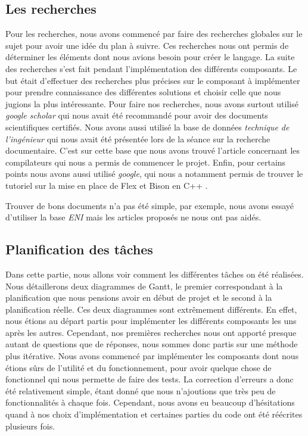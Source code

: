 \documentclass[a4paper]{article}%
\begin{document}
\subsection{Les recherches}

Pour les recherches, nous avons commencé par faire des recherches globales sur
le sujet pour avoir une idée du plan à suivre. Ces recherches nous ont permis de
déterminer les éléments dont nous avions besoin pour créer le langage. La suite
des recherches s'est fait pendant l'implémentation des différents composants. Le
but était d'effectuer des recherches plus précises sur le composant à
implémenter pour prendre connaissance des différentes solutions et choisir
celle que nous jugions la plus intéressante. Pour faire nos recherches, nous
avons surtout utilisé \textit{google scholar} qui nous avait été recommandé
pour avoir des documents scientifiques certifiés. Nous avons aussi utilisé la
base de données \textit{technique de l'ingénieur} qui nous avait été présentée
lors de la séance sur la recherche documentaire. C'est sur cette base que nous
avons trouvé l'article concernant les compilateurs \cite{compilerTICH} qui nous
a permis de commencer le projet. Enfin, pour certains points nous avons aussi
utilisé \textit{google}, qui nous a notamment permis de trouver le tutoriel sur
la mise en place de Flex et Bison en C++ \cite{cppparsing}.

Trouver de bons documents n'a pas été simple, par exemple, nous avons essayé
d'utiliser la base \textit{ENI} mais les articles proposés ne nous ont pas
aidés.

\clearpage
\subsection{Planification des tâches}

Dans cette partie, nous allons voir comment les différentes tâches on été
réalisées. Nous détaillerons deux diagrammes de Gantt, le premier correspondant
à la planification que nous pensions avoir en début de projet et le second à la
planification réelle. Ces deux diagrammes sont extrêmement différents. En effet,
nous étions au départ partis pour implémenter les différents composants les uns
après les autres. Cependant, nos premières recherches nous ont apporté presque
autant de questions que de réponses, nous sommes donc partis sur une méthode plus
itérative. Nous avons commencé par implémenter les composants dont nous étions
sûrs de l'utilité et du fonctionnement, pour avoir quelque chose de fonctionnel
qui nous permette de faire des tests. La correction d'erreurs a donc été
relativement simple, étant donné que nous n'ajoutions que très peu de
fonctionnalités à chaque fois. Cependant, nous avons eu beaucoup d'hésitations
quand à nos choix d'implémentation et certaines parties du code ont été
réécrites plusieurs fois.\\
\end{document}
